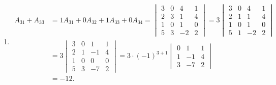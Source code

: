 \begin{exercise}
\begin{exgroup}
\begin{answer}
\begin{enumerate}
                \item \begin{align*}
                            A_{31}+A_{33}
                            & = 1A_{31}+0A_{32}+1A_{33}+0A_{34}
                            = \begin{vmatrix}
                                3 & 0 & 4  & 1 \\
                                2 & 3 & 1  & 4 \\
                                1 & 0 & 1  & 0 \\
                                5 & 3 & -2 & 2
                            \end{vmatrix}
                            = 3 \begin{vmatrix}
                                    3 & 0 & 4  & 1 \\
                                    2 & 1 & 1  & 4 \\
                                    1 & 0 & 1  & 0 \\
                                    5 & 1 & -2 & 2
                                \end{vmatrix}                   \\
                            & = 3 \begin{vmatrix}
                                    3 & 0 & 1  & 1 \\
                                    2 & 1 & -1 & 4 \\
                                    1 & 0 & 0  & 0 \\
                                    5 & 3 & -7 & 2
                                \end{vmatrix}
                            = 3 \cdot (-1)^{3+1} \begin{vmatrix}
                                                    0 & 1  & 1 \\
                                                    1 & -1 & 4 \\
                                                    3 & -7 & 2
                                                \end{vmatrix}  \\
                            & = -12.
                        \end{align*}


\end{enumerate}
\end{answer}
\end{exgroup}
\end{exercise}
